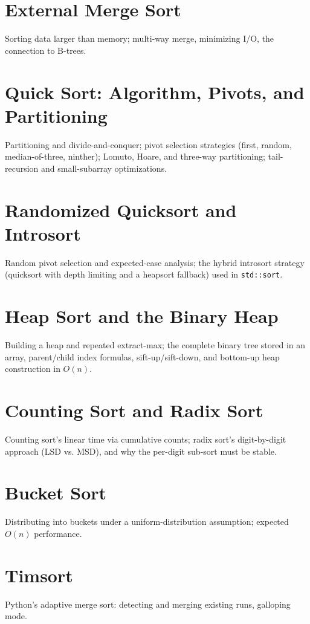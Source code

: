 \chapter{External Merge Sort}
Sorting data larger than memory; multi-way merge, minimizing I/O, the connection to B-trees.

\chapter{Quick Sort: Algorithm, Pivots, and Partitioning}
Partitioning and divide-and-conquer; pivot selection strategies (first, random, median-of-three, ninther); Lomuto, Hoare, and three-way partitioning; tail-recursion and small-subarray optimizations.

\chapter{Randomized Quicksort and Introsort}
Random pivot selection and expected-case analysis; the hybrid introsort strategy (quicksort with depth limiting and a heapsort fallback) used in \texttt{std::sort}.

\chapter{Heap Sort and the Binary Heap}
Building a heap and repeated extract-max; the complete binary tree stored in an array, parent/child index formulas, sift-up/sift-down, and bottom-up heap construction in $O(n)$.

\chapter{Counting Sort and Radix Sort}
Counting sort's linear time via cumulative counts; radix sort's digit-by-digit approach (LSD vs. MSD), and why the per-digit sub-sort must be stable.

\chapter{Bucket Sort}
Distributing into buckets under a uniform-distribution assumption; expected $O(n)$ performance.

\chapter{Timsort}
Python's adaptive merge sort: detecting and merging existing runs, galloping mode.

